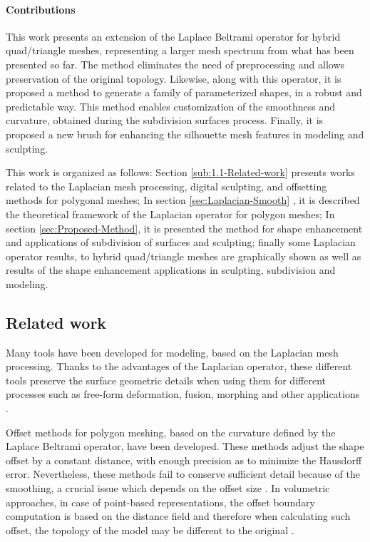 \documentclass[10pt, conference]{IEEEtran}
\begin{document}
\paragraph*{Contributions}
%
This work presents an extension of the Laplace
Beltrami operator for hybrid quad/triangle meshes, representing a
larger mesh spectrum from what has been presented so far. The method
eliminates the need of preprocessing and allows preservation of the
original topology. Likewise, along with this operator, it is proposed
a method to generate a family of parameterized shapes, in a robust
and predictable way. This method enables customization of the smoothness
and curvature, obtained during the subdivision surfaces process. Finally,
it is proposed a new brush for enhancing the silhouette mesh features
in modeling and sculpting.

This work is organized as follows: Section \ref{sub:1.1-Related-work}
presents works related to the Laplacian mesh processing, digital sculpting,
and offsetting methods for polygonal meshes; In section \ref{sec:Laplacian-Smooth}
, it is described the theoretical framework of the Laplacian operator
for polygon meshes; In section \ref{sec:Proposed-Method}, it is presented
the method for shape enhancement and applications of subdivision of
surfaces and sculpting; finally some Laplacian operator results, to
hybrid quad/triangle meshes are graphically shown as well as results
of the shape enhancement applications in sculpting, subdivision and
modeling.


\subsection{Related work\label{sub:1.1-Related-work}}
%
Many tools have been developed for modeling, based on the Laplacian
mesh processing. Thanks to the advantages of the Laplacian operator,
these different tools preserve the surface geometric details when
using them for different processes such as free-form deformation,
fusion, morphing and other applications \cite{Sorkine2004}. 

Offset methods for polygon meshing, based on the curvature defined
by the Laplace Beltrami operator, have been developed. These methods
adjust the shape offset by a constant distance, with enough precision
as to minimize the Hausdorff error. Nevertheless, these methods fail
to conserve sufficient detail because of the smoothing, a crucial
issue which depends on the offset size \cite{Zhuo2012}. In volumetric
approaches, in case of point-based representations, the offset boundary
computation is based on the distance field and therefore when calculating
such offset, the topology of the model may be different to the original
\cite{Chen2011}.
\end{document}
